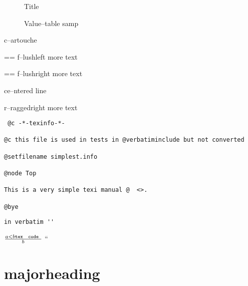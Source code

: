 \documentclass{book}
\makeatletter
\newcommand\GNUTexinfotablestylesamp[1]{\ifstrempty{#1}{}{`\texttt{#1}'}}%
\newenvironment{GNUTexinfopreformatted}{%
  \par\GNUTobeylines\obeyspaces\frenchspacing
  \parskip=\z@\parindent=\z@}{}
{\catcode`\^^M=13 \gdef\GNUTobeylines{\catcode`\^^M=13 \def^^M{\null\par}}}
\newcommand{\GNUTexinfoplaceholder}[1]{}
\newcommand{\GNUTexinfonopagebreakheading}[2]{{\let\clearpage\relax \let\cleardoublepage\relax \let\thispagestyle\GNUTexinfoplaceholder #1{#2}}}
\makeatother
\begin{document}
\begin{description}
\item[] Title
\item[{\parbox[b]{\linewidth}{%
\GNUTexinfotablestylesamp{a{-}{-}samp}\\
\GNUTexinfotablestylesamp{a2{-}{-}samp}}}]
Value--table samp
\end{description}

\begin{mdframed}[style=GNUTexinfocartouche]
c--artouche
\end{mdframed}

\begin{flushleft}
\begin{GNUTexinfopreformatted}%
f--lushleft
more text
\end{GNUTexinfopreformatted}
\end{flushleft}

\begin{flushright}
\begin{GNUTexinfopreformatted}%
f--lushright
more text
\end{GNUTexinfopreformatted}
\end{flushright}

\begin{center}
ce--ntered line
\end{center}

\begin{flushleft}
r--raggedright
more text
\end{flushleft}

\begin{verbatim}
 @c -*-texinfo-*-

@c this file is used in tests in @verbatiminclude but not converted

@setfilename simplest.info

@node Top

This is a very simple texi manual @  <>.

@bye
\end{verbatim}

\begin{verbatim}
in verbatim ''
\end{verbatim}





$\frac{a < b \texttt{tex \hbox{ code }}}{b}$ ``

\GNUTexinfonopagebreakheading{\chapter*}{{majorheading}}
\end{document}
